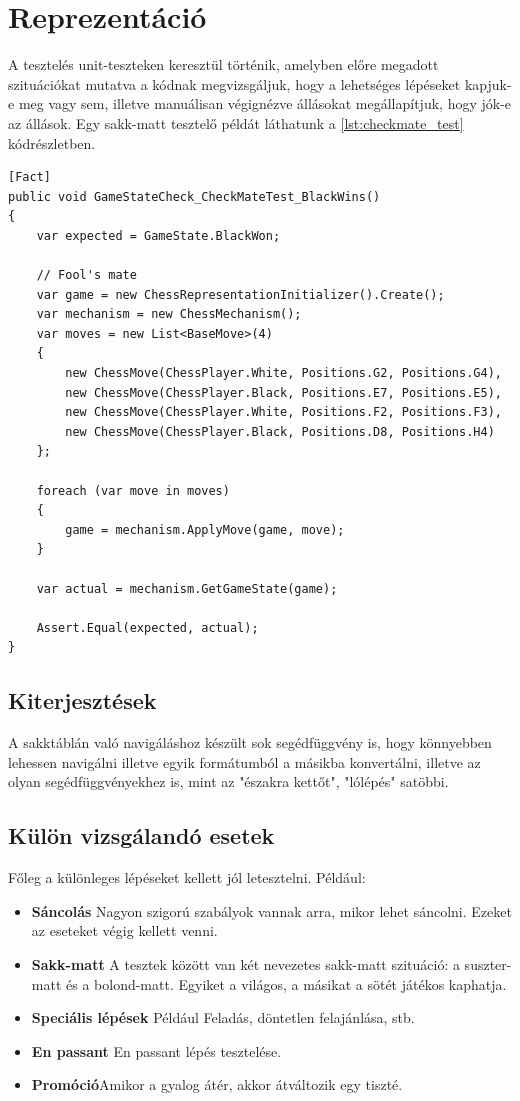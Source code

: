 \documentclass[twoside, a4paper, 12pt]{book}
\begin{document}
\section{Reprezentáció}
A tesztelés unit-teszteken keresztül történik, amelyben előre megadott szituációkat mutatva a kódnak megvizsgáljuk, hogy a lehetséges lépéseket kapjuk-e meg vagy sem, illetve manuálisan végignézve állásokat megállapítjuk, hogy jók-e az állások. Egy sakk-matt tesztelő példát láthatunk a \ref{lst:checkmate_test} kódrészletben.

\begin{lstlisting}[caption=Sakk-matt detektálás teszt, label=lst:checkmate_test, float]
[Fact]
public void GameStateCheck_CheckMateTest_BlackWins()
{
	var expected = GameState.BlackWon;
	
	// Fool's mate
	var game = new ChessRepresentationInitializer().Create();
	var mechanism = new ChessMechanism();
	var moves = new List<BaseMove>(4)
	{
		new ChessMove(ChessPlayer.White, Positions.G2, Positions.G4),
		new ChessMove(ChessPlayer.Black, Positions.E7, Positions.E5),
		new ChessMove(ChessPlayer.White, Positions.F2, Positions.F3),
		new ChessMove(ChessPlayer.Black, Positions.D8, Positions.H4)
	};
	
	foreach (var move in moves)
	{
		game = mechanism.ApplyMove(game, move);
	}
	
	var actual = mechanism.GetGameState(game);
	
	Assert.Equal(expected, actual);
}
\end{lstlisting}
\subsection{Kiterjesztések}
A sakktáblán való navigáláshoz készült sok segédfüggvény is, hogy könnyebben lehessen navigálni illetve egyik formátumból a másikba konvertálni, illetve az olyan segédfüggvényekhez is, mint az "északra kettőt", "lólépés" satöbbi.

\subsection{Külön vizsgálandó esetek}
Főleg a különleges lépéseket kellett jól letesztelni. Például:
\begin{itemize}
	\item \textbf{Sáncolás} Nagyon szigorú szabályok vannak arra, mikor lehet sáncolni. Ezeket az eseteket végig kellett venni.
	
	\item \textbf{Sakk-matt} A tesztek között van két nevezetes sakk-matt szituáció: a suszter-matt és a bolond-matt. Egyiket a világos, a másikat a sötét játékos kaphatja.
	
	\item \textbf{Speciális lépések} Például Feladás, döntetlen felajánlása, stb.
	
	\item \textbf{En passant} En passant lépés tesztelése.
	
	\item \textbf{Promóció}Amikor a gyalog átér, akkor átváltozik egy tiszté.
\end{itemize}
\end{document}
